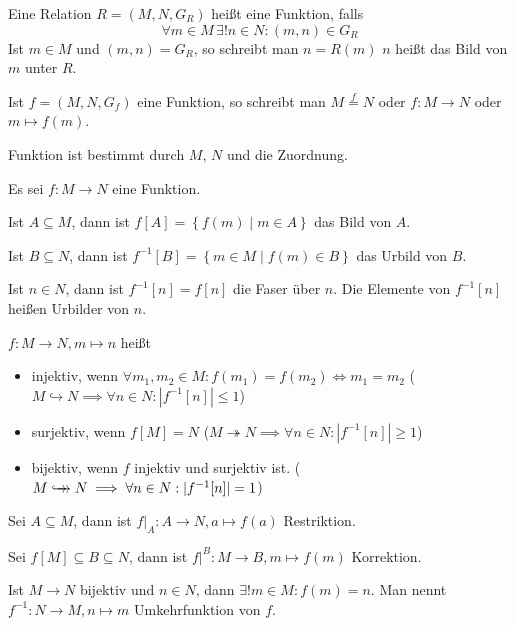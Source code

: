 \begin{definition}
  Eine Relation $R = (M, N, G_R)$ heißt eine Funktion, falls
  \[ \forall m \in M\, \exists! n \in N: (m, n) \in G_R \]
  Ist $m \in M$ und $(m, n) = G_R$, so schreibt man $n = R(m)$
  $n$ heißt das Bild von $m$ unter $R$.
\end{definition}
\begin{remark}
  Ist $f = (M, N, G_f)$ eine Funktion, so schreibt man $M \stackrel{f}{=} N$ oder $f: M \to N$ oder $m \mapsto f(m)$.\index[sym]{$\to$}\index[sym]{$\mapsto$}

  Funktion ist bestimmt durch $M$, $N$ und die Zuordnung.
\end{remark}
\begin{definition}
  Es sei $f: M \to N$ eine Funktion.

  Ist $A \subseteq M$, dann ist $f[A] = \left\{ f(m) \middle| m \in A \right\}$ das Bild von $A$.

  Ist $B \subseteq N$, dann ist $f^{-1}[B] = \left\{ m \in M \middle| f(m) \in B \right\}$ das Urbild von $B$.

  Ist $n \in N$, dann ist $f^{-1}[n] = f[{n}]$ die Faser über $n$. Die Elemente von $f^{-1}[n]$ heißen Urbilder von $n$.
\end{definition}
\begin{definition}
  $f: M \to N, m \mapsto n$ heißt
  \begin{itemize}
  \item injektiv, wenn $\forall m_1, m_2 \in M: f(m_1) = f(m_2) \iff m_1 = m_2$ ($M \hookrightarrow N \implies \forall n \in N: |f^{-1}[n]| \le 1$)
  \item surjektiv, wenn $f[M] = N$ ($M \twoheadrightarrow N \implies \forall n \in N: |f^{-1}[n]| \ge 1$)
  \item bijektiv, wenn $f$ injektiv und surjektiv ist. ($M \hookrightarrow\mathrel{\mspace{-13mu}}\rightarrow N \implies \forall n \in N: |f^{-1}[n]| = 1$)
  \end{itemize}
\end{definition}
\begin{definition}
  Sei $A \subseteq M$, dann ist $f|_A: A \to N, a \mapsto f(a)$ Restriktion.

  Sei $f[M] \subseteq B \subseteq N$, dann ist $f|^B: M \to B, m \mapsto f(m)$ Korrektion.
\end{definition}
\begin{remark}
  Ist $M \to N$ bijektiv und $n \in N$, dann $\exists! m \in M: f(m) = n$. Man nennt $f^{-1}: N \to M, n \mapsto m$ Umkehrfunktion von $f$.
\end{remark}

